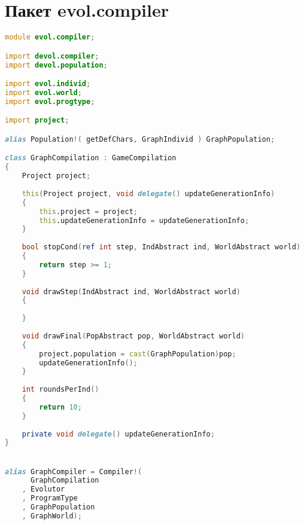 \documentclass[russian,utf8,emptystyle]{eskdtext}
\begin{document}
\section{Пакет evol.compiler}
\begin{lstlisting}[language=D]
module evol.compiler;

import devol.compiler;
import devol.population;

import evol.individ;
import evol.world;
import evol.progtype;

import project;

alias Population!( getDefChars, GraphIndivid ) GraphPopulation;

class GraphCompilation : GameCompilation
{
    Project project;
    
	this(Project project, void delegate() updateGenerationInfo)
	{
	    this.project = project;
		this.updateGenerationInfo = updateGenerationInfo;
	}
	
    bool stopCond(ref int step, IndAbstract ind, WorldAbstract world)
    {
        return step >= 1;
    }
    
    void drawStep(IndAbstract ind, WorldAbstract world)
    {
        
    }
    
    void drawFinal(PopAbstract pop, WorldAbstract world)
    {
        project.population = cast(GraphPopulation)pop;	
    	updateGenerationInfo();
    }
    
    int roundsPerInd()
    {
        return 10;
    }
    
    private void delegate() updateGenerationInfo;
}


alias GraphCompiler = Compiler!(
      GraphCompilation
    , Evolutor
    , ProgramType
    , GraphPopulation
    , GraphWorld);

\end{lstlisting}
\end{document}

